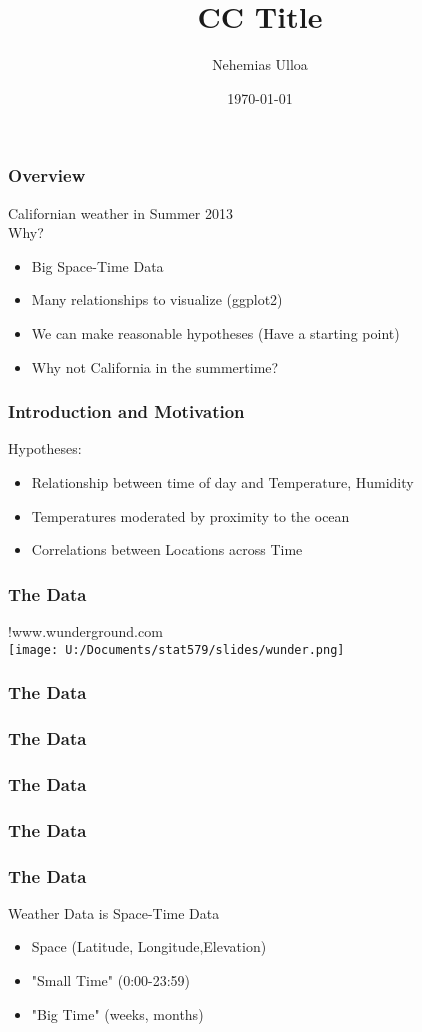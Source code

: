 \documentclass{beamer}
\title[CC Title]{CC Title}
\author{Nehemias Ulloa}
\institute{\Large{Department of Statistics\\ Iowa State University}}
\date{\today}
\begin{document}
\begin{frame}
\titlepage
\end{frame}


\begin{frame}
\frametitle{Overview}
Californian weather in Summer 2013\\
Why?
\begin{itemize}
\item<1-> Big Space-Time Data
\item<2-> Many relationships to visualize (ggplot2)
\item<3->We can make reasonable hypotheses (Have a starting point)
\item<4-> Why not California in the summertime?
\end{itemize}
\end{frame}


\begin{frame}
\frametitle{Introduction and Motivation}
Hypotheses:
\begin{itemize}
\item Relationship between time of day and Temperature, Humidity
\item Temperatures moderated by proximity to the ocean
\item Correlations between Locations across Time
\end{itemize}
\end{frame}

\begin{frame}
\frametitle{The Data}
!www.wunderground.com\\
\texttt{[image: U:/Documents/stat579/slides/wunder.png]}
\end{frame}

\begin{frame}
\frametitle{The Data}
\end{frame}
\begin{frame}
\frametitle{The Data}
\end{frame}
\begin{frame}
\frametitle{The Data}
\end{frame}
\begin{frame}
\frametitle{The Data}
\end{frame}


\begin{frame}
\frametitle{The Data}
Weather Data is Space-Time Data
\begin{itemize}
\item Space (Latitude, Longitude,Elevation)
\item "Small Time" (0:00-23:59)
\item "Big Time" (weeks, months)
\end{itemize}
	
\end{frame}
\end{document}
